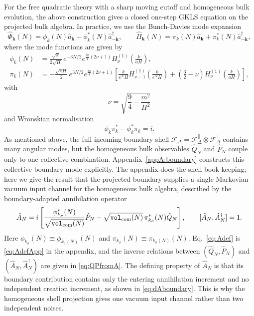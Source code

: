 \documentclass{article}
\newcommand{\VF}{\mathtt{vol}_{\rm com}}
\newcommand{\hvarphi}{\hat{\Phi}}
\newcommand{\hpi}{\hat{\Pi}}
\numberwithin{equation}{section}
\begin{document}
	For the free quadratic theory with a sharp moving cutoff and homogeneous bulk evolution, the above construction gives a closed one-step GKLS equation on the projected bulk algebra. In practice, we use the Bunch-Davies mode expansion
	\begin{equation}\label{eq:modeexpansion}
		\hvarphi_{\bm k}(N) = \phi_k(N)\hat a_{\bm k} + \phi_k^*(N)\hat a_{-\bm k}^{\dagger}, \qquad \hpi_{\bm k}(N) = \pi_k(N)\hat a_{\bm k} + \pi_k^*(N)\hat a_{-\bm k}^{\dagger},
	\end{equation}
	where the mode functions are given by
	\begin{align}
		\label{eq:HankelBoundaryModesMain:phi}
		\phi_{k}(N) &= \frac{\sqrt{\pi}}{2\sqrt H}\, e^{-3N/2} e^{\tfrac{i\pi}{4}(2\nu+1)} H_\nu^{(1)}\left(\frac{k}{aH}\right), \\ \pi_{k}(N) &= -\frac{\sqrt{\pi H}}{2}\, e^{3N/2} e^{\tfrac{i\pi}{4}(2\nu+1)} \left[ \frac{k}{e^{N}H} H_{\nu-1}^{(1)}\left(\frac{k}{e^{N}H}\right) + \left(\frac32-\nu\right)H_\nu^{(1)}\left(\frac{k}{aH}\right) \right] ,
		\label{eq:HankelBoundaryModesMain:pi}
	\end{align}
	with
	\begin{equation}
		\nu = \sqrt{\frac94-\frac{m^2}{H^2}}
	\end{equation}
	and Wronskian normalisation
	\begin{equation}\label{eq:Wronskian}
		\phi_k\pi_k^*-\phi_k^*\pi_k=i .
	\end{equation}
	As mentioned above, the full incoming boundary shell $\mathcal{F}_\Delta=\mathcal{F}_\Delta^\parallel \otimes \mathcal{F}_\Delta^\perp$ contains many angular modes, but the homogeneous bulk observables \(\hat Q_N\) and \(\hat P_N\) couple only to one collective combination. Appendix~\ref{appA:boundary} constructs this collective boundary mode explicitly. The appendix does the shell book-keeping; here we give the result that the projected boundary supplies a single Markovian vacuum input channel for the homogeneous bulk algebra, described by the boundary-adapted annihilation operator
	\begin{equation}\label{eq:Adef}
		\hat A_N = i\left[ \frac{\phi_{k_\sigma}^*(N)}{\sqrt{\VF(N)}}\hat P_N - \sqrt{\VF(N)}\,\pi_{k_\sigma}^*(N)\hat Q_N \right], \qquad [\hat A_N,\hat A_N^\dagger]=1 .
	\end{equation}
	Here \(\phi_{k_\sigma}(N)\equiv\phi_{k_\sigma(N)}(N)\) and \(\pi_{k_\sigma}(N)\equiv\pi_{k_\sigma(N)}(N)\). Eq.~\eqref{eq:Adef} is \cref{eq:AdefApp} in the appendix, and the inverse relations between \((\hat Q_N,\hat P_N)\) and \((\hat A_N,\hat A_N^\dagger)\) are given in \cref{eq:QPfromA}. The defining property of \(\hat A_N\) is that its boundary contribution contains only the entering annihilation increment and no independent creation increment, as shown in \cref{eq:dAboundary}. This is why the homogeneous shell projection gives one vacuum input channel rather than two independent noises.
\end{document}
